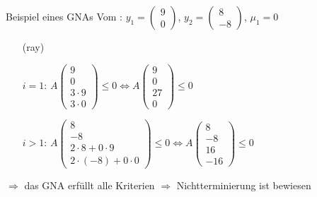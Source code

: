 \begin{frame}
	\begin{exampleblock}{Beispiel eines GNAs }
		Vom \solver: $y_1=\begin{pmatrix} 9 \\ 0 \end{pmatrix}$, $y_2=\begin{pmatrix} 8 \\ -8 \end{pmatrix}$, $\mu_1=0$\newline
		\begin{itemize}
			\setlength{\itemindent}{0.5cm}
			\item[(ray)]
			\item[$i=1$:]  $A\begin{pmatrix} 9 \\ 0 \\ 3\cdot 9 \\ 3\cdot 0 \end{pmatrix} \le 0 \Leftrightarrow A\begin{pmatrix} 9 \\ 0 \\ 27 \\ 0 \end{pmatrix} \le 0$ \checkmark
			\item[$i>1$:] $A\begin{pmatrix} 8 \\ -8 \\ 2\cdot 8+0\cdot 9 \\ 2\cdot (-8)+0\cdot 0 \end{pmatrix} \le 0 \Leftrightarrow A\begin{pmatrix} 8 \\ -8 \\ 16 \\ -16 \end{pmatrix} \le 0$ \checkmark
		\end{itemize}
		$\Rightarrow$ das GNA erf\"ullt alle Kriterien\newline
		$\Rightarrow$ Nichtterminierung ist bewiesen
	\end{exampleblock}
\end{frame}






